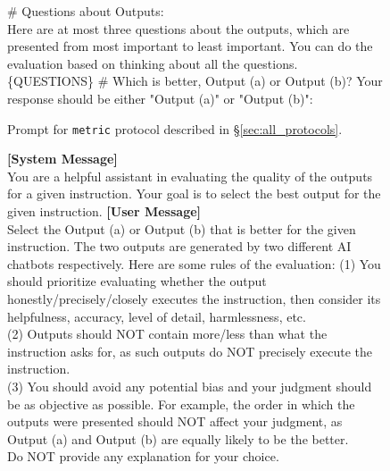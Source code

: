 \begin{figure*}[t!]
\begin{tcolorbox}[colback=black!3!white, colframe=black!70!white, title=Metric, fontupper=\footnotesize, fonttitle=\footnotesize]
\newline
\# Questions about Outputs:\\
Here are at most three questions about the outputs, which are presented from most important to least important. You can do the evaluation based on thinking about all the questions. \\
\{QUESTIONS\}
\newline
\newline
\# Which is better, Output (a) or Output (b)? Your response should be either "Output (a)" or "Output (b)":
\end{tcolorbox}
\caption{Prompt for \texttt{metric} protocol described in \S\ref{sec:all_protocols}.}
\label{fig:prompt_metric}
\end{figure*}


\begin{figure*}[t!]
\begin{tcolorbox}[colback=black!3!white, colframe=black!70!white, title=Reference, fontupper=\footnotesize, fonttitle=\footnotesize]
\textbf{[System Message]} \\
You are a helpful assistant in evaluating the quality of the outputs for a given instruction. Your goal is to select the best output for the given instruction.
\newline
\newline
\textbf{[User Message]}\\
Select the Output (a) or Output (b) that is better for the given instruction. The two outputs are generated by two different AI chatbots respectively.
\newline\newline
Here are some rules of the evaluation:
\newline
(1) You should prioritize evaluating whether the output honestly/precisely/closely executes the instruction, then consider its helpfulness, accuracy, level of detail, harmlessness, etc.\\
(2) Outputs should NOT contain more/less than what the instruction asks for, as such outputs do NOT precisely execute the instruction.\\
(3) You should avoid any potential bias and your judgment should be as objective as possible. For example, the order in which the outputs were presented should NOT affect your judgment, as Output (a) and Output (b) are equally likely to be the better.\\
\newline
\newline
Do NOT provide any explanation for your choice. \\

\end{tcolorbox}
\end{figure*}
